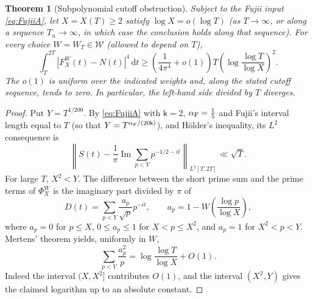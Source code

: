 \documentclass[11pt,a4paper]{article}
\numberwithin{equation}{section}
\newtheorem{theorem}{Theorem}[section]
\theoremstyle{definition}
\theoremstyle{remark}
\newcommand{\dd}{\,\mathrm dt}
\begin{document}
\begin{theorem}[Subpolynomial cutoff obstruction]\label{thm:smallX}
Subject to the Fujii input \eqref{eq:FujiiA}, let $X=X(T)\ge2$ satisfy $\log X=o(\log T)$ (as $T\to\infty$, or along a sequence $T_n\to\infty$, in which case the conclusion holds along that sequence). For every choice $W=W_T\in\mathcal W$ (allowed to depend on $T$),
\begin{equation}\label{eq:smallX}
\int_T^{2T}|F_X^W(t)-N(t)|^4\dd
\ge\left(\frac1{4\pi^4}+o(1)\right)
 T\left(\log\frac{\log T}{\log X}\right)^2.
\end{equation}
The $o(1)$ is uniform over the indicated weights and, along the stated cutoff sequence, tends to zero. In particular, the left-hand side divided by $T$ diverges.
\end{theorem}
\begin{proof}
Put $Y=T^{1/200}$. By \eqref{eq:FujiiA} with $\mathsf k=2$, $\alpha_{\rm F}=\frac15$ and Fujii's interval length equal to $T$ (so that $Y=T^{\alpha_{\rm F}/(20\mathsf k)}$), and H\"older's inequality, its $L^2$ consequence is
\begin{equation}\label{eq:FujiiL2}
\left\|S(t)-\frac1\pi\operatorname{Im}\sum_{p<Y}p^{-1/2-it}\right\|_{L^2[T,2T]}
\ll\sqrt T.
\end{equation}
For large $T$, $X^2<Y$. The difference between the short prime sum and the prime terms of $\Phi_X^W$ is the imaginary part divided by $\pi$ of
\begin{equation}\label{eq:diffprime}
D(t)=\sum_{p<Y}\frac{a_p}{\sqrt p}p^{-it},\qquad
a_p=1-W\!\left(\frac{\log p}{\log X}\right),
\end{equation}
where $a_p=0$ for $p\le X$, $0\le a_p\le1$ for $X<p\le X^2$, and $a_p=1$ for $X^2<p<Y$.
Mertens' theorem \cite{Mertens1874} yields, uniformly in $W$,
\begin{equation}\label{eq:diffvar}
\sum_{p<Y}\frac{a_p^2}{p}
=\log\frac{\log T}{\log X}+O(1).
\end{equation}
Indeed the interval $(X,X^2]$ contributes $O(1)$, and the interval $(X^2,Y)$ gives the claimed logarithm up to an absolute constant.


\end{proof}
\end{document}
